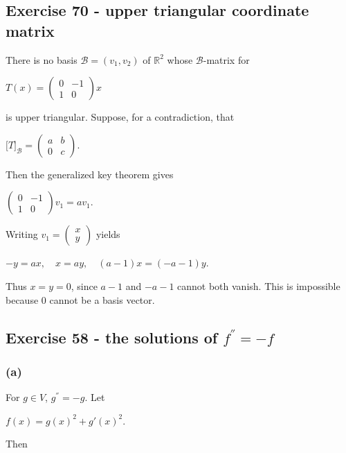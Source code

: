 \subsection{Exercise 70 - upper triangular coordinate matrix}

There is no basis \(\mathcal{B} = \left( {v_{1},v_{2}} \right)\) of \(\mathbb{R}^{2}\) whose \(\mathcal{B}\)-matrix for

\(T(x) = \begin{pmatrix}
0 & {- 1} \\
1 & 0
\end{pmatrix}x\)

is upper triangular. Suppose, for a contradiction, that

\(\lbrack T\rbrack_{\mathcal{B}} = \begin{pmatrix}
a & b \\
0 & c
\end{pmatrix}.\)

Then the generalized key theorem gives

\(\begin{pmatrix}
0 & {- 1} \\
1 & 0
\end{pmatrix}v_{1} = av_{1}.\)

Writing \(v_{1} = \begin{pmatrix}
x \\
y
\end{pmatrix}\) yields

\(- y = ax,\quad x = ay,\quad\left( {a - 1} \right)x = \left( {- a - 1} \right)y.\)

Thus \(x = y = 0\), since \(a - 1\) and \(- a - 1\) cannot both vanish. This is impossible because \(0\) cannot be a basis vector.

\subsection{\texorpdfstring{Exercise 58 - the solutions of \(f^{''} = - f\)}{Exercise 58 - the solutions of f\^{}\{\textquotesingle\textquotesingle\} = - f}}

\subsubsection{(a)}

For \(g \in V\), \(g^{''} = - g\). Let

\(f(x) = {g(x)}^{2} + g'(x)^{2}.\)

Then


